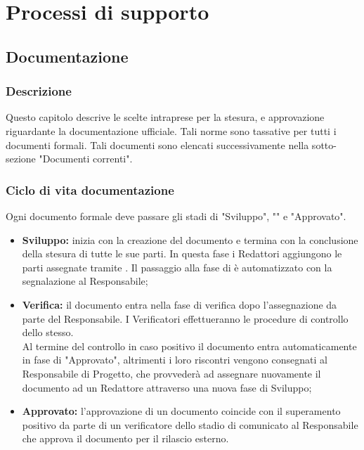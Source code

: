 \documentclass[NormeDiProgetto.tex]{subfiles}
\begin{document}
	
	\chapter{Processi di supporto}
	
	\section{Documentazione}
	\subsection{Descrizione}
	Questo capitolo descrive le scelte intraprese per la
	stesura,  e approvazione riguardante la documentazione ufficiale.
	Tali norme sono tassative per tutti i documenti formali.
	Tali documenti sono elencati successivamente nella sotto-sezione "Documenti correnti". 
	
	\subsection{Ciclo di vita documentazione}
	Ogni documento formale deve passare gli stadi di "Sviluppo", "" e "Approvato".
	\begin{itemize}
		\item \textbf{Sviluppo:} inizia con la creazione del documento e termina con la conclusione della stesura di tutte le sue parti. In questa fase i Redattori aggiungono le parti assegnate tramite .
		Il passaggio alla fase di  è automatizzato con la segnalazione al Responsabile;
		
		\item \textbf{Verifica:} il documento entra nella fase di verifica dopo l'assegnazione da parte del Responsabile. I Verificatori effettueranno le procedure di controllo dello stesso.\\
		Al termine del controllo in caso positivo il documento entra automaticamente in fase di "Approvato", altrimenti i loro riscontri vengono consegnati al Responsabile di Progetto, che provvederà ad assegnare nuovamente il documento ad un Redattore attraverso una nuova fase di Sviluppo; 
		
		\item \textbf{Approvato:} l'approvazione di un documento coincide con il superamento positivo da parte di un verificatore dello stadio di  comunicato al Responsabile che approva il documento per il rilascio esterno.
	\end{itemize}
	
\end{document}
